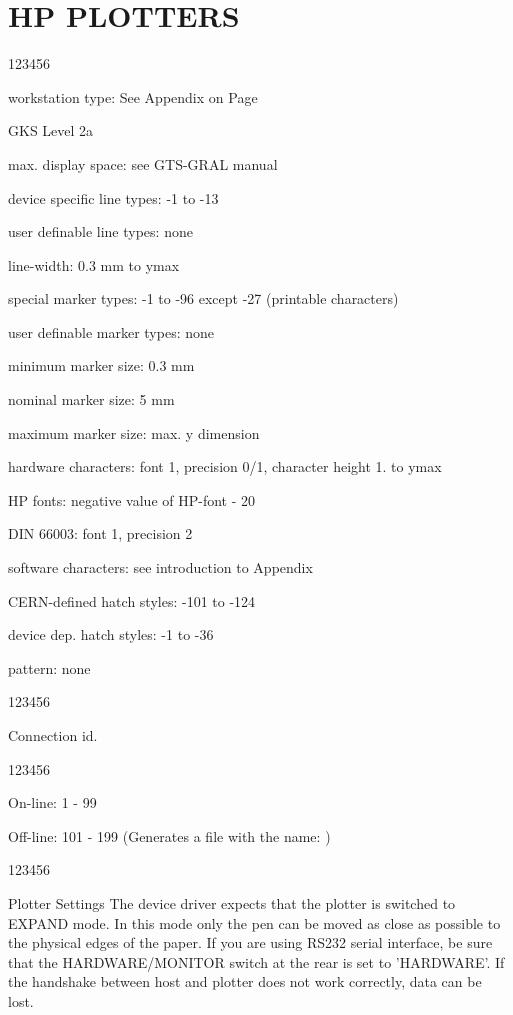 \section{HP PLOTTERS}
\begin{DLtt}{123456}
\item[workstation type:]See Appendix on Page~\pageref{sec:gtstyp}
\item[GKS Level]2a
\item[max. display space:]see GTS-GRAL manual
\item[device specific line types:]-1 to -13
\item[user definable line types:]none
\item[line-width:]0.3 mm to ymax
\item[special marker types:]-1 to -96 except -27 (printable characters)
\item[user definable marker types:]none
\item[minimum marker size:]0.3 mm
\item[nominal marker size:]5 mm
\item[maximum marker size:]max. y dimension
\item[hardware characters:]font 1, precision 0/1, character height 1. to ymax
\item[HP fonts:]negative value of HP-font - 20
\item[DIN 66003:]font 1, precision 2
\item[software characters:]see introduction to Appendix
\item[CERN-defined hatch styles:]-101 to -124
\item[device dep. hatch styles:]-1 to -36
\item[pattern:]none
\end{DLtt}
\begin{DLtt}{123456}
\item[Connection id.]
 \begin{DLtt}{123456}
 \item[On-line:]1 - 99
 \item[Off-line:]101 - 199 (Generates a file with
the name: )
 \end{DLtt}
\end{DLtt}
\begin{DLtt}{123456}
\item[Plotter Settings]The device driver expects that
the plotter is switched to
EXPAND mode. In this mode only the pen can be moved as close as
possible to the physical edges of the paper. If you are using
RS232 serial interface, be sure that the HARDWARE/MONITOR switch
at the rear is set to 'HARDWARE'. If the handshake between host
and plotter does not work correctly, data can be lost.
\end{DLtt}
